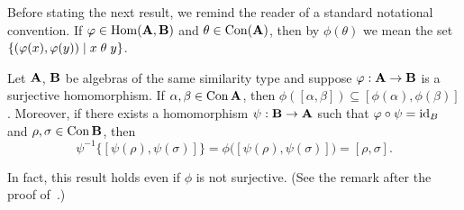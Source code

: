 Before stating the next result, we remind the reader of a
standard notational convention.
If $\varphi \in \operatorname{Hom}(\mathbf{A}, \mathbf{B})$ and $\theta \in \operatorname{Con} (\mathbf{A})$, then by
$\phi(\theta)$ we mean the set $\{(\varphi(x), \varphi(y)) \mid x \mathrel{\theta} y \}$.
\begin{lem}
\label{lem:hom-image-diff-term}
  Let $\mathbf{A}$, $\mathbf{B}$ be algebras of the same similarity type and suppose
  $\varphi: \mathbf{A} \to \mathbf{B}$ is a surjective homomorphism.  If
  $\alpha, \beta \in \operatorname{Con} \mathbf{A}$, then
  $\phi([\alpha, \beta]) \subseteq [\phi(\alpha), \phi(\beta)]$.
  Moreover, if there exists a homomorphism $\psi: \mathbf{B} \to \mathbf{A}$ such that
  $\varphi \circ \psi = \operatorname{id}_B$ and $\rho, \sigma \in \operatorname{Con} \mathbf{B}$, then
  \[
    \psi^{-1} \{ [ \psi(\rho), \psi(\sigma) ] \} =
    \phi \bigl( [\psi(\rho), \psi(\sigma)] \bigr)
    = [\rho, \sigma].
  \]
\end{lem}
In fact, this result holds even if $\phi$ is not surjective. (See the remark
after the proof of~\cite[Theorem 2.10]{MR1358491}.)

